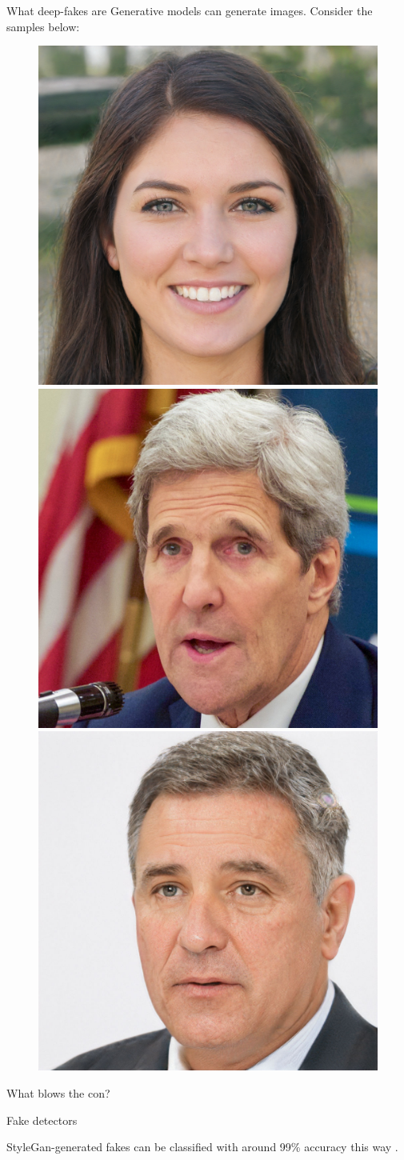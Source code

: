 \documentclass{beamer}
\begin{document}
    \begin{frame}{What deep-fakes are}
      Generative models can generate images. Consider the samples below:
      \begin{figure}
      \includegraphics[width=0.32\linewidth]{./figures/style_gan_ffhq_example300.png}
      \includegraphics[width=0.32\linewidth]{./figures/00062.png}
      \includegraphics[width=0.32\linewidth]{./figures/style_gan_ffhq_example304.jpg}
      \end{figure}
    \end{frame}

    \begin{frame}{What blows the con?}
      \begin{figure}
        
        
        
      \end{figure}
    \end{frame}

    \begin{frame}{Fake detectors}
      \begin{figure}
        
        
      \end{figure}
      StyleGan-generated fakes can be classified with around 99\% accuracy this way \cite{frank2020leveraging}.
    \end{frame}
\end{document}
